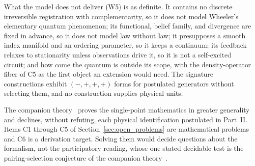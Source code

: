 What the model does not deliver (W5) is as definite. It contains no discrete irreversible registration with complementarity, so it does not model Wheeler's elementary quantum phenomenon; its functional, belief family, and divergence are fixed in advance, so it does not model law without law; it presupposes a smooth index manifold and an ordering parameter, so it keeps a continuum; its feedback relaxes to stationarity unless observations drive it, so it is not a self-excited circuit; and how come the quantum is outside its scope, with the density-operator fiber of C5 as the first object an extension would need. The signature constructions exhibit $(-,+,+,+)$ forms for postulated generators without selecting them, and no construction supplies physical units.

The companion theory~\cite{DennisGaugeVFE2026} proves the single-point mathematics in greater generality and declines, without refuting, each physical identification postulated in Part~II. Items C1 through C5 of Section~\ref{sec:open_problems} are mathematical problems and C6 is a derivation target. Solving them would decide questions about the formalism, not the participatory reading, whose one stated decidable test is the pairing-selection conjecture of the companion theory~\cite[Ch.~14]{DennisGaugeVFE2026}.
